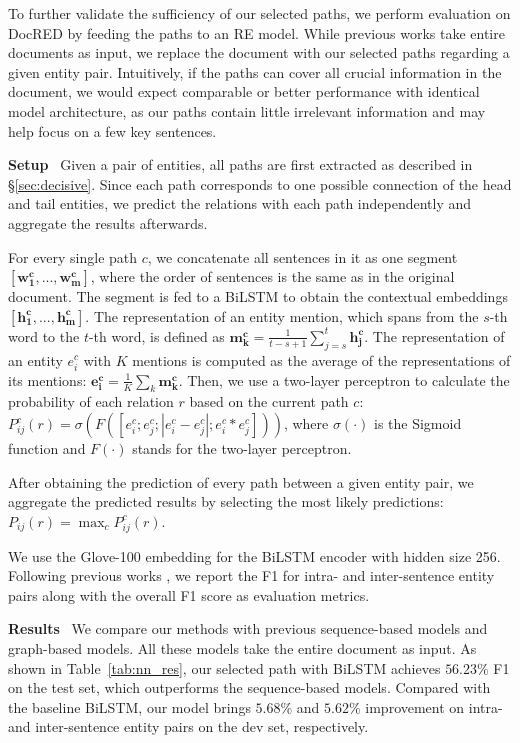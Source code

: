 \documentclass[11pt,a4paper]{article}
\begin{document}
To further validate the sufficiency of our selected paths, we perform evaluation on DocRED  by feeding the paths to an RE model.  While previous works take entire documents as input, we replace the document with our selected paths regarding a given entity pair. Intuitively, if the paths can cover all crucial information in the document, we would expect comparable or better 
performance with identical model architecture, as our paths contain little irrelevant information and may help focus on a few key sentences.

\noindent\textbf{Setup}~
Given a pair of entities, all paths are first extracted as described in \S\ref{sec:decisive}. Since each path corresponds to one possible connection of the head and tail entities, we predict the relations with each path independently and aggregate the results afterwards.

For every single path $c$, we concatenate all sentences in it as one segment $[\mathbf{w_1^c}, ..., \mathbf{w_m^c}]$, where the order of sentences is the same as in the original document. The segment is fed to a BiLSTM to obtain the contextual embeddings $[\mathbf{h_1^c}, ..., \mathbf{h_m^c}]$. The representation of an entity mention, which spans from the $s$-th word to the $t$-th word, is defined as $\mathbf{m_k^c} = \frac{1}{t-s+1} \sum_{j=s}^t \mathbf{h_j^c}$. The representation of an entity $e_i^c$ with $K$ mentions is computed as the average of the representations of its mentions: $\mathbf{e_i^c} = \frac{1}{K} \sum_k \mathbf{m_k^c}$. Then, we use a two-layer perceptron to calculate the probability of each relation $r$ based on the current path $c$: $P^c_{ij}(r) = \sigma(F([e_i^c; e_j^c; |e_i^c - e_j^c|; e_i^c * e_j^c]))$, where $\sigma(\cdot)$ is the Sigmoid function and $F(\cdot)$ stands for the two-layer perceptron.

After obtaining the prediction of every path between a given entity pair, we aggregate the predicted results by selecting the most likely predictions: $P_{ij}(r) = \max_c P^c_{ij}(r)$.

We use the Glove-100 \cite{glove} embedding for the BiLSTM encoder with hidden size 256. Following previous works \cite{nan2020reasoning}, we report the F1 for intra- and inter-sentence entity pairs along with the overall F1 score as evaluation metrics.

\noindent\textbf{Results}~
We compare our methods with previous sequence-based models and graph-based models. All these models take the entire document as input. As shown in Table~\ref{tab:nn_res}, our selected path with BiLSTM achieves $56.23\%$ F1 on the test set, which outperforms the sequence-based models. Compared with the baseline BiLSTM, our model brings $5.68\%$ and $5.62\%$ improvement on intra- and inter-sentence entity pairs on the dev set, respectively. 
\end{document}
